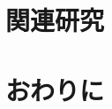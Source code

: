 \documentclass[submit]{ipsj_v2/UTF8/ipsj}
\begin{document}
\section{関連研究}
\label{sec:RelatedWork}

\section{おわりに}
\label{sec:Conclusion}




\end{document}
